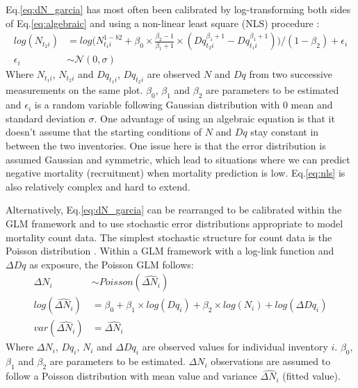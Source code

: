\documentclass[12pt,english]{article}
\begin{document}
Eq.\ref{eq:dN_garcia} has most often been calibrated by log-transforming both sides of Eq.\ref{eq:algebraic} and using a non-linear least square (NLS) procedure \citep{Garcia2013}:
\begin{align}
	\label{eq:nls}
	log(N_{t_2i}) &= log \Big( N_{t_1i}^{1-b2} + \beta_0 \times \frac{\beta_2-1}{\beta_1+1} \times (Dq_{t_2i}^{\beta_1+1} - Dq_{t_1i}^{\beta_1+1}) \Big) \Big/ (1-\beta_2) + \epsilon_i\\
	\epsilon_i &\sim \mathcal{N} (0, \sigma) \nonumber      
\end{align}
Where $N_{t_1i}$, $N_{t_2i}$ and $Dq_{t_1i}$, $Dq_{t_2i}$ are observed $N$ and $Dq$ from two successive measurements on the same plot. $\beta_0$, $\beta_1$ and $\beta_2$ are parameters to be estimated and $\epsilon_i$ is a random variable following Gaussian distribution with 0 mean and standard deviation $\sigma$. One advantage of using an algebraic equation is that it doesn't assume that the starting conditions of $N$ and $Dq$ stay constant in between the two inventories. One issue here is that the error distribution is assumed Gaussian and symmetric, which lead to situations where we can predict negative mortality (recruitment) when mortality prediction is low. Eq.\ref{eq:nls} is also relatively complex and hard to extend.

Alternatively, Eq.\ref{eq:dN_garcia} can be rearranged to be calibrated within the GLM framework and to use stochastic error distributions appropriate to model mortality count data. The simplest stochastic structure for count data is the Poisson distribution \citep{Bolker2008}. Within a GLM framework with a log-link function and $\Delta Dq$ as exposure, the Poisson GLM follows:
\begin{align}
  \label{eq:glm_pois}
    \Delta N_i &\sim Poisson(\widehat{\Delta N_i})\\
    log(\widehat{\Delta N_i}) &= \beta_0 + \beta_1 \times log(Dq_i) + \beta_2 \times log(N_i) + log(\Delta Dq_i) \nonumber \\
    var(\widehat{\Delta N_i}) &= \widehat{\Delta N_i} \nonumber
\end{align}
Where $\Delta N_i$, $Dq_i$, $N_i$ and $\Delta Dq_i$ are observed values for individual inventory $i$. $\beta_0$, $\beta_1$ and  $\beta_2$ are parameters to be estimated. $\Delta N_i$ observations are assumed to follow a Poisson distribution with mean value and variance $\widehat{\Delta N_i}$ (fitted value).
\end{document}
